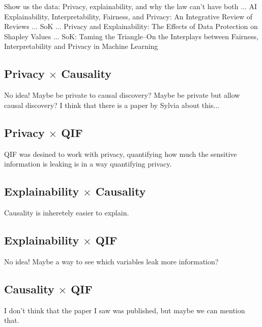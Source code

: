 {\color{red} Show us the data: Privacy, explainability, and why the law can't have both   ...    AI Explainability, Interpretability, Fairness, and Privacy: An Integrative Review of Reviews     ...  SoK    ...     Privacy and Explainability: The Effects of Data Protection on Shapley Values     ...   SoK: Taming the Triangle--On the Interplays between Fairness, Interpretability and Privacy in Machine Learning}

\subsection{Privacy $\times$ Causality}

{\color{red} No idea! Maybe be private to causal discovery? Maybe be private but allow causal discovery? I think that there is a paper by Sylvia about this...}

\subsection{Privacy $\times$ QIF}

{\color{red} QIF was desined to work with privacy, quantifying how much the sensitive information is leaking is in a way quantifying privacy.}

\subsection{Explainability $\times$ Causality}

{\color{red} Causality is inheretely easier to explain.}

\subsection{Explainability $\times$ QIF}

{\color{red} No idea! Maybe a way to see which variables leak more information?}

\subsection{Causality $\times$ QIF}

{\color{red} I don't think that the paper I saw was published, but maybe we can mention that.}

